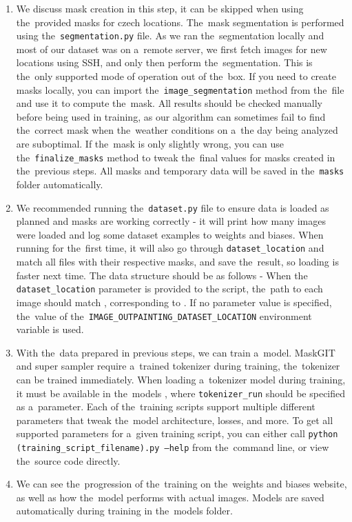 \begin{enumerate}
    \item We discuss mask creation in this step, it can be skipped when using the~provided masks for czech locations. The~mask segmentation is performed using the~\texttt{segmentation.py} file. As we ran the~segmentation locally and most of our dataset was on a~remote server, we first fetch images for new locations using SSH, and only then perform the~segmentation. This is the~only supported mode of operation out of the~box. If you need to create masks locally, you can import the~\texttt{image\_segmentation} method from the~file and use it to compute the~mask. All results should be checked manually before being used in training, as our algorithm can sometimes fail to find the~correct mask when the~weather conditions on a~the day being analyzed are suboptimal. If the~mask is only slightly wrong, you can use the~\texttt{finalize\_masks} method to tweak the~final values for masks created in the~previous steps. All masks and temporary data will be saved in the~\texttt{masks} folder automatically.
    
    \item We recommended running the~\texttt{dataset.py} file to ensure data is loaded as planned and masks are working correctly - it will print how many images were loaded and log some dataset examples to weights and biases. When running for the~first time, it will also go through \texttt{dataset\_location} and match all files with their respective masks, and save the~result, so loading is faster next time. The data structure should be as follows - When the \texttt{dataset\_location} parameter is provided to the script, the~path to each image should match , corresponding to . If no parameter value is specified, the~value of the~\texttt{IMAGE\_OUTPAINTING\_DATASET\_LOCATION} environment variable is used.

    \item With the~data prepared in previous steps, we can train a~model. MaskGIT and super sampler require a~trained tokenizer during training, the~tokenizer can be trained immediately. When loading a~tokenizer model during training, it must be available in the~models  , where \texttt{tokenizer\_run} should be specified as a~parameter. Each of the~training scripts support multiple different parameters that tweak the~model architecture, losses, and more. To get all supported parameters for a~given training script, you can either call \texttt{python (training\_script\_filename).py --help} from the~command line, or view the~source code directly.

    \item We can see the~progression of the~training on the~weights and biases website, as well as how the~model performs with actual images. Models are saved automatically during training in the~models folder.

\end{enumerate}

